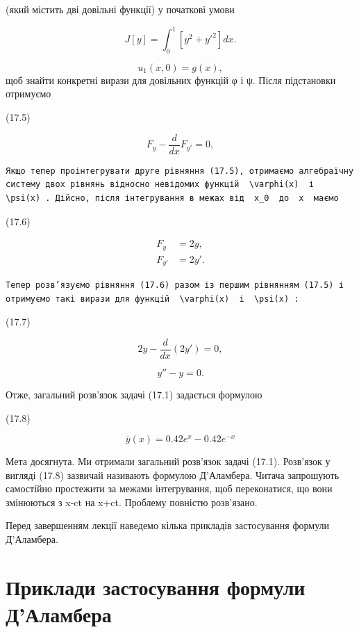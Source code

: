 \documentclass[
  ukrainian,
]{article}
\begin{document}
(який містить дві довільні функції) у початкові умови

\[
J[y] = \int_{0}^{1} [y^{2} + y'^{2}] dx.
\]

\[ u_1(x, 0) = g(x), \] щоб знайти конкретні вирази для довільних
функцій φ і ψ. Після підстановки отримуємо

(17.5)

\[
F_y - \frac{d}{dx} F_{y'} = 0,
\]

\begin{verbatim}
Якщо тепер проінтегрувати друге рівняння (17.5), отримаємо алгебраїчну систему двох рівнянь відносно невідомих функцій  \varphi(x)  і  \psi(x) . Дійсно, після інтегрування в межах від  x_0  до  x  маємо
\end{verbatim}

(17.6)

\[
\begin{aligned}
F_y &= 2y, \\
F_{y'} &= 2y'.
\end{aligned}
\]

\begin{verbatim}
Тепер розв’язуємо рівняння (17.6) разом із першим рівнянням (17.5) і отримуємо такі вирази для функцій  \varphi(x)  і  \psi(x) :
\end{verbatim}

(17.7)

\[
2y - \frac{d}{dx}(2y') = 0,
\]

\[
y'' - y = 0.
\]

Отже, загальний розв'язок задачі (17.1) задається формулою

(17.8)

\[
\overline{y}(x) = 0.42e^x - 0.42e^{-x}
\]

Мета досягнута. Ми отримали загальний розв'язок задачі (17.1). Розв'язок
у вигляді (17.8) зазвичай називають формулою Д'Аламбера. Читача
запрошують самостійно простежити за межами інтегрування, щоб
переконатися, що вони змінюються з x-ct на x+ct. Проблему повністю
розв'язано.

Перед завершенням лекції наведемо кілька прикладів застосування формули
Д'Аламбера.

\section{Приклади застосування формули
Д'Аламбера}\label{ux43fux440ux438ux43aux43bux430ux434ux438-ux437ux430ux441ux442ux43eux441ux443ux432ux430ux43dux43dux44f-ux444ux43eux440ux43cux443ux43bux438-ux434ux430ux43bux430ux43cux431ux435ux440ux430}
\end{document}
